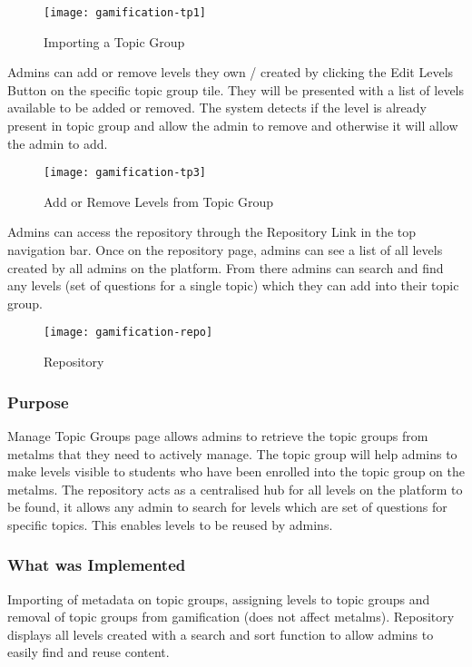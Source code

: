 \begin{figure}[h!]
    \texttt{[image: gamification-tp1]}
    \centering
    \caption{Importing a Topic Group}
\end{figure}

Admins can add or remove levels they own / created by clicking the Edit Levels Button on the specific topic group tile. They will be presented with a list of levels available to be added or removed. The system detects if the level is already present in topic group and allow the admin to remove and otherwise it will allow the admin to add.

\begin{figure}[h!]
    \texttt{[image: gamification-tp3]}
    \centering
    \caption{Add or Remove Levels from Topic Group}
\end{figure}

Admins can access the repository through the Repository Link in the top navigation bar. Once on the repository page, admins can see a list of all levels created by all admins on the platform. From there admins can search and find any levels (set of questions for a single topic) which they can add into their topic group. 

\begin{figure}[h!]
    \texttt{[image: gamification-repo]}
    \centering
    \caption{Repository}
\end{figure}

\newpage

\subsubsection{Purpose}
Manage Topic Groups page allows admins to retrieve the topic groups from metalms that they need to actively manage. The topic group will help admins to make levels visible to students who have been enrolled into the topic group on the metalms. The repository acts as a centralised hub for all levels on the platform to be found, it allows any admin to search for levels which are set of questions for specific topics. This enables levels to be reused by admins.

\subsubsection{What was Implemented}
Importing of metadata on topic groups, assigning levels to topic groups and removal of topic groups from gamification (does not affect metalms). Repository displays all levels created with a search and sort function to allow admins to easily find and reuse content.

